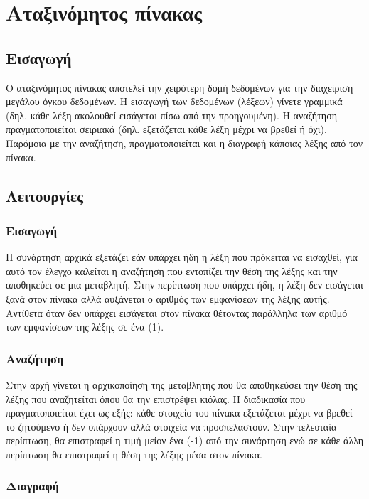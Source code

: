 \chapter{Αταξινόμητος πίνακας}

\section{Εισαγωγή}

Ο αταξινόμητος πίνακας αποτελεί την χειρότερη δομή δεδομένων για την διαχείριση μεγάλου όγκου δεδομένων. Η εισαγωγή των δεδομένων (λέξεων) γίνετε γραμμικά (δηλ. κάθε λέξη ακολουθεί εισάγεται πίσω από την προηγουμένη). Η αναζήτηση πραγματοποιείται σειριακά (δηλ. εξετάζεται κάθε λέξη μέχρι να βρεθεί ή όχι). Παρόμοια με την αναζήτηση, πραγματοποιείται και η διαγραφή κάποιας λέξης από τον πίνακα.

\section{Λειτουργίες}

\subsection{Εισαγωγή}

Η συνάρτηση αρχικά εξετάζει εάν υπάρχει ήδη η λέξη που πρόκειται να εισαχθεί, για αυτό τον έλεγχο καλείται η αναζήτηση που εντοπίζει την θέση της λέξης και την αποθηκεύει σε μια μεταβλητή. Στην περίπτωση που υπάρχει ήδη, η λέξη δεν εισάγεται ξανά στον πίνακα αλλά αυξάνεται ο αριθμός των εμφανίσεων της λέξης αυτής. Αντίθετα όταν δεν υπάρχει εισάγεται στον πίνακα θέτοντας παράλληλα των αριθμό των εμφανίσεων της λέξης σε ένα (1).

\subsection{Αναζήτηση}

Στην αρχή γίνεται η αρχικοποίηση της μεταβλητής που θα αποθηκεύσει την θέση της λέξης που αναζητείται όπου θα την επιστρέψει κιόλας. Η διαδικασία που πραγματοποιείται έχει ως εξής: κάθε στοιχείο του πίνακα εξετάζεται μέχρι να βρεθεί το ζητούμενο ή δεν υπάρχουν αλλά στοιχεία να προσπελαστούν. Στην τελευταία περίπτωση, θα επιστραφεί η τιμή μείον ένα (-1) από την συνάρτηση ενώ σε κάθε άλλη περίπτωση θα επιστραφεί η θέση της λέξης μέσα στον πίνακα. 

\subsection{Διαγραφή}

